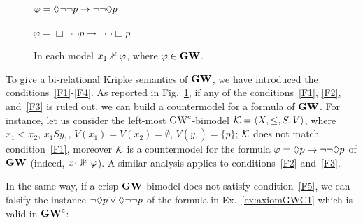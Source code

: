 \begin{figure}[t]
\begin{minipage}{9em}
\begin{tikzpicture}[scale=0.8]
\end{tikzpicture}
$\varphi= \lozenge\neg\neg  p\to \neg\neg \lozenge p$
  \end{minipage}
     \begin{minipage}{9em}\small\center
$\varphi= \Box \neg\neg p\to \neg\neg \Box p$
     \end{minipage}
  
  \caption{In each model $x_1\nVdash\varphi$, where $\varphi\in\mathbf{GW}$.}
  \label{fig:Fcountermodels}
\end{figure}



To give a bi-relational Kripke semantics of $\mathbf{GW}$, we have introduced the
conditions~\ref{F1}-\ref{F4}.  As reported in
Fig.~\ref{fig:Fcountermodels}, if any of the conditions~\ref{F1},
\ref{F2}, and~\ref{F3}  is ruled out, we can build a
countermodel for a formula of $\mathbf{GW}$. For instance, let us consider
the left-most $\mbox{$\mathrm{GW}^\mathrm{c}$}$-bimodel $\mathcal{K}=\langle X,\leq,S,V \rangle$, where $x_1 <
x_2$, $x_1 S y_1$,  $V(x_1)=V(x_2)=\emptyset$,   $V(y_1)=\{p\}$; $\mathcal{K}$ does not match
condition~\ref{F1}, moreover $\mathcal{K}$ is a countermodel for the formula
$\varphi= \lozenge p\to \neg\neg\lozenge p$ of $\mathbf{GW}$ (indeed,
$x_1\nVdash \varphi$). A similar analysis applies to conditions~\ref{F2} and~\ref{F3}.

In the same way, if  a crisp $\mathbf{GW}$-bimodel does not satisfy condition~\ref{F5},
we can falsify the instance $\neg\lozenge p\lor \lozenge\neg\neg p$ of the formula in  Ex.~\ref{ex:axiomGWC1}
which is valid in $\mathbf{GW}^\mathrm{c}$:


